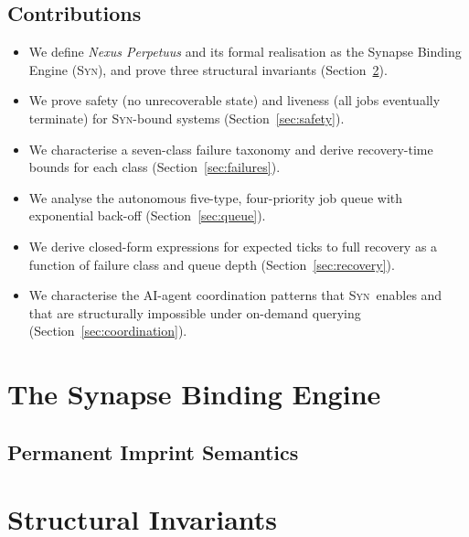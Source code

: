 \documentclass[11pt,a4paper]{article}
\newcommand{\SYN}{\textsc{Syn}}
\begin{document}
\subsection*{Contributions}

\begin{itemize}
  \item We define \emph{Nexus Perpetuus} and its formal realisation as the
        Synapse Binding Engine (\SYN), and prove three structural invariants
        (Section~\ref{sec:invariants}).
  \item We prove safety (no unrecoverable state) and liveness (all jobs
        eventually terminate) for \SYN-bound systems
        (Section~\ref{sec:safety}).
  \item We characterise a seven-class failure taxonomy and derive recovery-time
        bounds for each class (Section~\ref{sec:failures}).
  \item We analyse the autonomous five-type, four-priority job queue with
        exponential back-off (Section~\ref{sec:queue}).
  \item We derive closed-form expressions for expected ticks to full recovery
        as a function of failure class and queue depth
        (Section~\ref{sec:recovery}).
  \item We characterise the AI-agent coordination patterns that \SYN\ enables
        and that are structurally impossible under on-demand querying
        (Section~\ref{sec:coordination}).
\end{itemize}

\section{The Synapse Binding Engine}
\label{sec:syn}


\subsection{Permanent Imprint Semantics}
\label{sec:imprint}


\section{Structural Invariants}
\label{sec:invariants}
\end{document}
